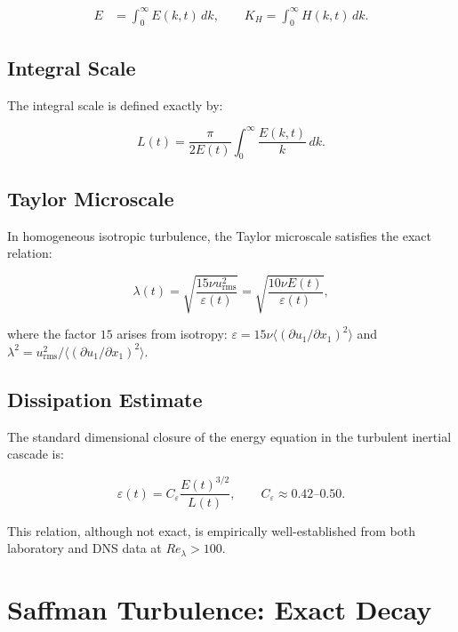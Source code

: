 \documentclass[12pt,a4paper]{article}
\newcommand{\eps}{\varepsilon}
\newcommand{\Relambda}{Re_{\lambda}}
\newcommand{\Ceps}{C_{\varepsilon}}
\newcommand{\KH}{K_{H}}
\theoremstyle{plain}
\theoremstyle{definition}
\begin{document}
\begin{align}
  E &= \int_0^{\infty} E(k,t)\,dk, \qquad
  \KH = \int_0^{\infty} H(k,t)\,dk.
\end{align}

\subsection{Integral Scale}

The integral scale is defined exactly by:

\begin{equation}
  L(t) = \frac{\pi}{2E(t)} \int_0^{\infty} \frac{E(k,t)}{k}\,dk.
  \label{eq:L_def}
\end{equation}

\subsection{Taylor Microscale}

In homogeneous isotropic turbulence, the Taylor microscale satisfies
the exact relation:

\begin{equation}
  \lambda(t) = \sqrt{\frac{15\nu u_{\mathrm{rms}}^2}{\eps(t)}}
             = \sqrt{\frac{10\nu E(t)}{\eps(t)}},
  \label{eq:lambda_exact}
\end{equation}

where the factor $15$ arises from isotropy:
$\eps = 15\nu\langle(\partial u_1/\partial x_1)^2\rangle$ and
$\lambda^2 = u_{\mathrm{rms}}^2/\langle(\partial u_1/\partial x_1)^2\rangle$.

\subsection{Dissipation Estimate}

The standard dimensional closure of the energy equation in the
turbulent inertial cascade is:

\begin{equation}
  \eps(t) = \Ceps \frac{E(t)^{3/2}}{L(t)}, \qquad
  \Ceps \approx 0.42\text{--}0.50.
  \label{eq:eps_closure}
\end{equation}

This relation, although not exact, is empirically well-established from
both laboratory and DNS data at $\Relambda > 100$.

\section{Saffman Turbulence: Exact Decay}
\label{sec:saffman}
\end{document}
